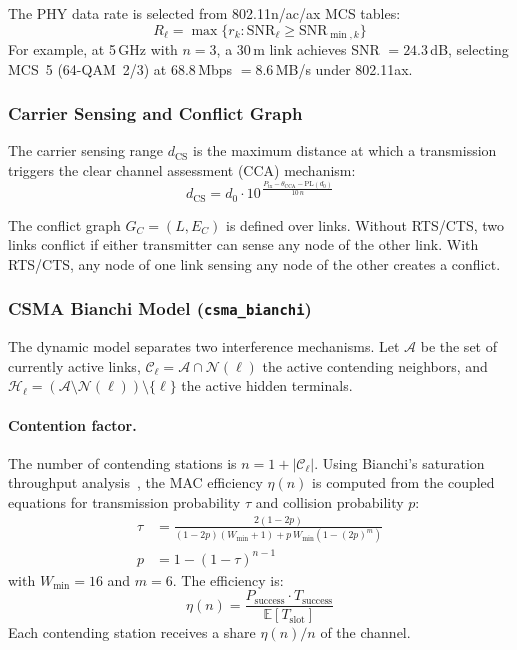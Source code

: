 \documentclass[conference]{IEEEtran}
\begin{document}
The PHY data rate is selected from 802.11n/ac/ax MCS tables:
\begin{equation}
R_\ell = \max\{r_k : \text{SNR}_\ell \geq \text{SNR}_{\min,k}\}
\label{eq:mcs}
\end{equation}
For example, at 5\,GHz with $n = 3$, a 30\,m link achieves SNR $= 24.3$\,dB,
selecting MCS~5 (64-QAM~2/3) at 68.8\,Mbps $= 8.6$\,MB/s under 802.11ax.

\subsubsection{Carrier Sensing and Conflict Graph}

The carrier sensing range $d_\text{CS}$ is the maximum distance at which a
transmission triggers the clear channel assessment (CCA) mechanism:
\begin{equation}
d_\text{CS} = d_0 \cdot 10^{\,\frac{P_\text{tx} - \theta_\text{CCA} - \text{PL}(d_0)}{10\,n}}
\label{eq:csrange}
\end{equation}

The conflict graph $G_C = (L, E_C)$ is defined over links.  Without RTS/CTS,
two links conflict if either transmitter can sense any node of the other
link.  With RTS/CTS, any node of one link sensing any node of the other
creates a conflict.

\subsubsection{CSMA Bianchi Model (\texttt{csma\_bianchi})}
\label{sec:bianchi}

The dynamic model separates two interference mechanisms.  Let $\mathcal{A}$
be the set of currently active links, $\mathcal{C}_\ell = \mathcal{A} \cap
\mathcal{N}(\ell)$ the active contending neighbors, and $\mathcal{H}_\ell =
(\mathcal{A} \setminus \mathcal{N}(\ell)) \setminus \{\ell\}$ the active
hidden terminals.

\paragraph{Contention factor.}
The number of contending stations is $n = 1 + |\mathcal{C}_\ell|$.  Using
Bianchi's saturation throughput analysis~\cite{bianchi2000}, the MAC
efficiency $\eta(n)$ is computed from the coupled equations for transmission
probability $\tau$ and collision probability $p$:
\begin{align}
\tau &= \frac{2(1 - 2p)}{(1 - 2p)(W_{\min} + 1) + p\,W_{\min}(1 - (2p)^m)} \label{eq:tau} \\
p &= 1 - (1 - \tau)^{n-1} \label{eq:p}
\end{align}
with $W_{\min} = 16$ and $m = 6$.  The efficiency is:
\begin{equation}
\eta(n) = \frac{P_\text{success} \cdot T_\text{success}}{\mathbb{E}[T_\text{slot}]}
\label{eq:eta}
\end{equation}
Each contending station receives a share $\eta(n)/n$ of the channel.
\end{document}
